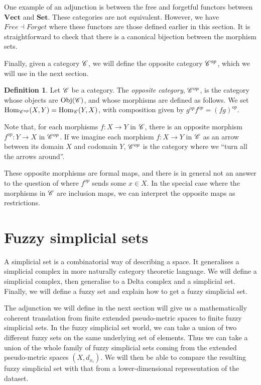\documentclass[a4paper,11pt,leqno]{article} \usepackage{amsmath}
\newcommand{\Hom}{\ensuremath{\operatorname{Hom}}}
\newcommand{\Obj}{\ensuremath{\operatorname{Obj}}}
\theoremstyle{definition}
\newtheorem{defn}{Definition}
\begin{document}
One example of an adjunction is between the free and forgetful functors between
$\textbf{Vect}$ and $\textbf{Set}$.
These categories are not equivalent.
However, we have $Free\dashv Forget$ where these functors are those defined
earlier in this section.
It is straightforward to check that there is a canonical bijection between the
morphism sets.

Finally, given a category $\mathscr{C}$, we will define the opposite category $\mathscr{C}^{op}$,
which we will use in the next section.
\begin{defn}
  Let $\mathscr{C}$ be a category.
  The \emph{opposite category}, $\mathscr{C}^{op}$, is the category whose objects are
  $\Obj(\curC)$, and whose morphisms are defined as follows.
  We set $\Hom_{\curC^{op}}(X, Y) = \Hom_{\curC}(Y, X)$, with composition given
  by $g^{op}f^{op} = (fg)^{op}$.
\end{defn}
Note that, for each morphisms $f: X\to Y$ in $\mathscr{C}$, there is an opposite
morphism $f^{op}: Y\to X$ in $\mathscr{C}^{op}$.
If we imagine each morphism $f: X\to Y$ in $\mathscr{C}$ as an arrow between its
domain $X$ and codomain $Y$, $\mathscr{C}^{op}$ is the category where we ``turn all
the arrows around''.

These opposite morphisms are formal maps, and there is in general not an answer
to the question of where $f^{op}$ sends some $x\in X$.
In the special case where the morphisms in $\mathscr{C}$ are inclusion maps, we can
interpret the opposite maps as restrictions.

\section{Fuzzy simplicial sets}
\label{section_fss}

A simplicial set is a combinatorial way of describing a space.
It generalises a simplicial complex in more naturally category theoretic
language.
We will define a simplicial complex, then generalise to a Delta complex and
a simplicial set.
Finally, we will define a fuzzy set and explain how to get a fuzzy simplicial
set.

The adjunction we will define in the next section will give us a mathematically
coherent translation from finite extended pseudo-metric spaces to finite fuzzy
simplicial sets.
In the fuzzy simplicial set world, we can take a union of two different fuzzy
sets on the same underlying set of elements.
Thus we can take a union of the whole family of fuzzy simplicial sets coming
from the extended pseudo-metric spaces $(X, d_{x_i})$.
We will then be able to compare the resulting fuzzy simplicial set with that
from a lower-dimensional representation of the dataset.
\end{document}
